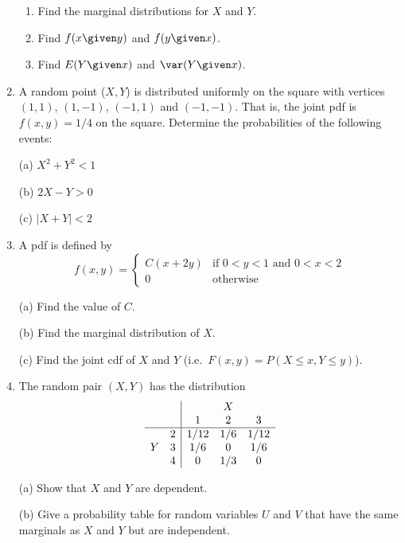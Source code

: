 \documentclass[12pt]{article}
\begin{document}
\begin{enumerate}
  \begin{enumerate}
  \item Find the marginal distributions for $X$ and $Y$.
  \item Find $f(x\given y)$ and $f(y\given x)$.
  \item Find $E(Y\given x)$ and $\var(Y\given x)$.
  \end{enumerate}

\item A random point ($X,Y$) is distributed uniformly on the square with
vertices
$(1,1)$, $(1,-1)$, $(-1,1)$ and $(-1,-1)$.
That is, the joint pdf is $f(x,y)=1/4$ on
the square. Determine the probabilities of the following events:

(a) $X^2 + Y^2 < 1$

(b) $2X-Y>0$

(c) $| X+Y | < 2$

\item A pdf is defined by
\[
f(x,y) =
\begin{cases}
    C(x+2y) & \text{if $0<y<1$ and $0<x<2$}\\
    0 & \text{otherwise}
\end{cases}
\]

(a) Find the value of $C$.

(b) Find the marginal distribution of $X$.

(c) Find the joint cdf of $X$ and $Y$ (i.e.\ $F(x,y) = P(X\le x, Y\le y)$).


\item The random pair $(X,Y)$ has the distribution
$$\begin{array}{cc|ccc}
& & & X & \\
& & 1 & 2 & 3 \\
\hline
& 2 & 1/12 & 1/6 & 1/12 \\
Y & 3 & 1/6 & 0 & 1/6 \\
& 4 & 0 & 1/3 & 0 
\end{array}$$

(a) Show that $X$ and $Y$ are dependent.

(b) Give a probability table for random variables $U$ and $V$ that have the
same marginals as $X$ and $Y$ but are independent.
\end{enumerate}
\end{document}
